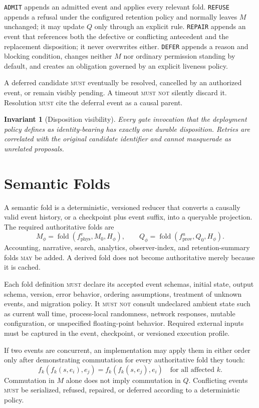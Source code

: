 \documentclass[11pt]{article}
\newtheorem{invariant}{Invariant}
\newcommand{\MUST}{\textsc{must}}
\newcommand{\MUSTNOT}{\textsc{must not}}
\newcommand{\MAY}{\textsc{may}}
\newcommand{\fold}{\operatorname{fold}}
\begin{document}
\texttt{ADMIT} appends an admitted event and applies every relevant fold. \texttt{REFUSE} appends a refusal under the configured retention policy and normally leaves $M$ unchanged; it may update $Q$ only through an explicit rule. \texttt{REPAIR} appends an event that references both the defective or conflicting antecedent and the replacement disposition; it never overwrites either. \texttt{DEFER} appends a reason and blocking condition, changes neither $M$ nor ordinary permission standing by default, and creates an obligation governed by an explicit liveness policy.

A deferred candidate \MUST{} eventually be resolved, cancelled by an authorized event, or remain visibly pending. A timeout \MUSTNOT{} silently discard it. Resolution \MUST{} cite the deferral event as a causal parent.

\begin{invariant}[Disposition visibility]
Every gate invocation that the deployment policy defines as identity-bearing has exactly one durable disposition. Retries are correlated with the original candidate identifier and cannot masquerade as unrelated proposals.
\end{invariant}

\section{Semantic Folds}
\label{sec:semantic-folds}

A semantic fold is a deterministic, versioned reducer that converts a causally valid event history, or a checkpoint plus event suffix, into a queryable projection. The required authoritative folds are
\[
M_{\phi}=\fold(f_{\mathrm{phys}}^{v},M_0,H_{\phi}),\qquad
Q_{\phi}=\fold(f_{\mathrm{prov}}^{u},Q_0,H_{\phi}).
\]
Accounting, narrative, search, analytics, observer-index, and retention-summary folds \MAY{} be added. A derived fold does not become authoritative merely because it is cached.

Each fold definition \MUST{} declare its accepted event schemas, initial state, output schema, version, error behavior, ordering assumptions, treatment of unknown events, and migration policy. It \MUSTNOT{} consult undeclared ambient state such as current wall time, process-local randomness, network responses, mutable configuration, or unspecified floating-point behavior. Required external inputs must be captured in the event, checkpoint, or versioned execution profile.

If two events are concurrent, an implementation may apply them in either order only after demonstrating commutation for every authoritative fold they touch:
\[
f_k(f_k(s,e_i),e_j)=f_k(f_k(s,e_j),e_i)
\quad\text{for all affected }k.
\]
Commutation in $M$ alone does not imply commutation in $Q$. Conflicting events \MUST{} be serialized, refused, repaired, or deferred according to a deterministic policy.
\end{document}
